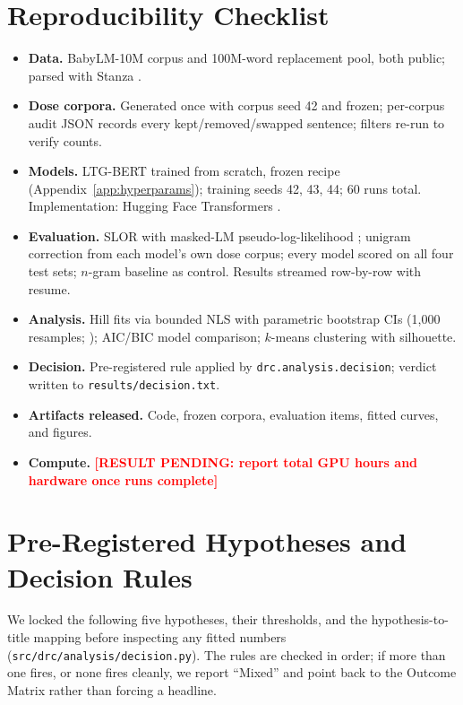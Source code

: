 \documentclass[11pt]{article}
\newcommand{\resultpending}[1]{%
  \textcolor{red}{\textbf{[RESULT PENDING: #1]}}}
\begin{document}
\section{Reproducibility Checklist}
\label{app:repro}
\begin{itemize}
  \item \textbf{Data.} BabyLM-10M corpus and 100M-word replacement pool,
        both public; parsed with Stanza \citep{qi2020stanza}.
  \item \textbf{Dose corpora.} Generated once with corpus seed 42 and
        frozen; per-corpus audit JSON records every kept/removed/swapped
        sentence; filters re-run to verify counts.
  \item \textbf{Models.} LTG-BERT trained from scratch, frozen recipe
        (Appendix~\ref{app:hyperparams}); training seeds 42, 43, 44; 60
        runs total. Implementation: Hugging Face Transformers
        \citep{wolf2020transformers}.
  \item \textbf{Evaluation.} SLOR with masked-LM pseudo-log-likelihood
        \citep{pauls2012slor}; unigram correction from each model's own
        dose corpus; every model scored on all four test sets; $n$-gram
        baseline as control. Results streamed row-by-row with resume.
  \item \textbf{Analysis.} Hill fits via bounded NLS with parametric
        bootstrap CIs (1{,}000 resamples; \citealp{efron1993bootstrap});
        AIC/BIC model comparison; $k$-means clustering with silhouette.
  \item \textbf{Decision.} Pre-registered rule applied by
        \texttt{drc.analysis.decision}; verdict written to
        \texttt{results/decision.txt}.
  \item \textbf{Artifacts released.} Code, frozen corpora, evaluation
        items, fitted curves, and figures.
  \item \textbf{Compute.} \resultpending{report total GPU hours and
        hardware once runs complete}
\end{itemize}

\section{Pre-Registered Hypotheses and Decision Rules}
\label{app:hypotheses}
We locked the following five hypotheses, their thresholds, and the
hypothesis-to-title mapping before inspecting any fitted numbers
(\texttt{src/drc/analysis/decision.py}). The rules are checked in order;
if more than one fires, or none fires cleanly, we report ``Mixed'' and
point back to the Outcome Matrix rather than forcing a headline.
\end{document}
